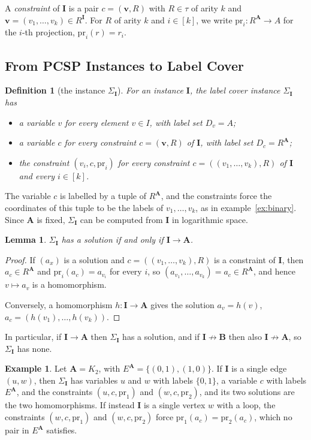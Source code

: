 \documentclass[11pt]{article}
\theoremstyle{plain}
\newtheorem{lemma}[theorem]{Lemma}
\newtheorem{definition}[theorem]{Definition}
\theoremstyle{definition}
\newtheorem{example}[theorem]{Example}
\newcommand{\pr}{\mathrm{pr}}
\newcommand{\bA}{\mathbf{A}}
\newcommand{\bB}{\mathbf{B}}
\newcommand{\bI}{\mathbf{I}}
\begin{document}
A \emph{constraint} of $\bI$ is a pair $c=(\mathbf v,R)$ with $R\in\tau$ of arity $k$ and $\mathbf v=(v_1,\dots,v_k)\in R^{\bI}$. For $R$ of arity $k$ and $i\in[k]$, we write $\pr_i\colon R^{\bA}\to A$ for the $i$-th projection, $\pr_i(r)=r_i$.

\subsection{From PCSP Instances to Label Cover}

\begin{definition}[the instance $\Sigma_{\bI}$]\label{def:sigma-I}
For an instance $\bI$, the label cover instance $\Sigma_{\bI}$ has
\begin{itemize}
  \item a variable $v$ for every element $v\in I$, with label set $D_v=A$;
  \item a variable $c$ for every constraint $c=(\mathbf v,R)$ of $\bI$, with label set $D_c=R^{\bA}$;
  \item the constraint $(v_i,c,\pr_i)$ for every constraint $c=((v_1,\dots,v_k),R)$ of $\bI$ and every $i\in[k]$.
\end{itemize}
\end{definition}

The variable $c$ is labelled by a tuple of $R^{\bA}$, and the constraints force the coordinates of this tuple to be the labels of $v_1,\dots,v_k$, as in example~\ref{ex:binary}. Since $\bA$ is fixed, $\Sigma_{\bI}$ can be computed from $\bI$ in logarithmic space.

\begin{lemma}\label{lem:sigma-sol}
$\Sigma_{\bI}$ has a solution if and only if $\bI\to\bA$.
\end{lemma}

\begin{proof}
If $(a_x)$ is a solution and $c=((v_1,\dots,v_k),R)$ is a constraint of $\bI$, then $a_c\in R^{\bA}$ and $\pr_i(a_c)=a_{v_i}$ for every $i$, so $(a_{v_1},\dots,a_{v_k})=a_c\in R^{\bA}$, and hence $v\mapsto a_v$ is a homomorphism.

Conversely, a homomorphism $h\colon\bI\to\bA$ gives the solution $a_v=h(v)$, $a_c=(h(v_1),\dots,h(v_k))$.
\end{proof}

In particular, if $\bI\to\bA$ then $\Sigma_{\bI}$ has a solution, and if $\bI\not\to\bB$ then also $\bI\not\to\bA$, so $\Sigma_{\bI}$ has none.

\begin{example}\label{ex:K2}
Let $\bA=K_2$, with $E^{\bA}=\{(0,1),(1,0)\}$. If $\bI$ is a single edge $(u,w)$, then $\Sigma_{\bI}$ has variables $u$ and $w$ with labels $\{0,1\}$, a variable $c$ with labels $E^{\bA}$, and the constraints $(u,c,\pr_1)$ and $(w,c,\pr_2)$, and its two solutions are the two homomorphisms. If instead $\bI$ is a single vertex $w$ with a loop, the constraints $(w,c,\pr_1)$ and $(w,c,\pr_2)$ force $\pr_1(a_c)=\pr_2(a_c)$, which no pair in $E^{\bA}$ satisfies.
\end{example}
\end{document}
